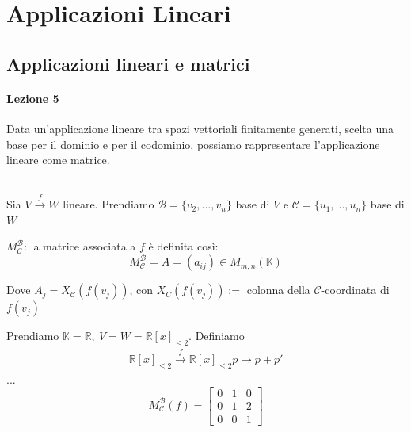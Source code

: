 



\chapter{Applicazioni Lineari}
\section{Applicazioni lineari e matrici}
\subsubsection{Lezione 5}

\begin{proposizione}
Data un'applicazione lineare tra spazi vettoriali finitamente generati, scelta una base per il dominio e per il codominio, possiamo rappresentare l'applicazione lineare come matrice.
\end{proposizione}
\leavevmode \\
Sia $V\xrightarrow{f} W$ lineare. Prendiamo $\mathscr{B} = \{v_2,...,v_n\}$ base di $V$ e $\mathscr{C} = \{u_1,...,u_n\}$ base di $W$
\begin{definizione}
    $M_{\mathscr{C}}^{\mathscr{B}}$: la matrice associata a $f$ è definita così:
    \begin{equation}
        M_{\mathscr{C}}^{\mathscr{B}} = A = (a_{ij})\in M_{m,n}(\mathbb{K})
    \end{equation}

    Dove $A_j=X_{\mathscr{C}}(f(v_j))$, con $X_C(f(v_j)) :=$ colonna della $\mathscr{C}$-coordinata di $f(v_j)$
\end{definizione}

\begin{esempio}
    Prendiamo $\mathbb{K}=\mathbb{R},\ V=W=\mathbb{R}[x]_{\leq 2}$. Definiamo
    \begin{gather}
        \mathbb{R}[x]_{\leq 2}\xrightarrow{f} \mathbb{R}[x]_{\leq 2}
        p\mapsto p+p'
    \end{gather}
    ...
    \begin{equation}
        M_{\mathscr{C}}^{\mathscr{B}}(f)=\begin{bmatrix}
            0 & 1 & 0 \\
            0 & 1 & 2 \\
            0 & 0 & 1
        \end{bmatrix}
    \end{equation}
\end{esempio}

